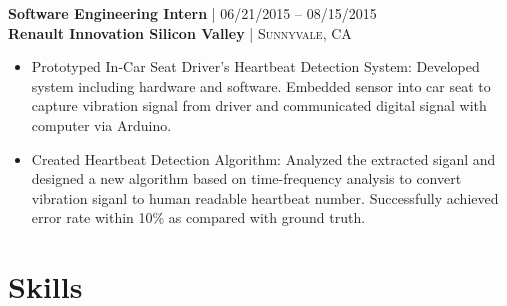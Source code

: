 \documentclass[10pt]{article} %
\begin{document}
{\begin{minipage}[t]{0.5\textwidth}
\begin{itemize}[leftmargin=*, topsep=2pt, partopsep=2.5pt]
\end{itemize}



{\raggedright\normalsize
\textbf{Software Engineering Intern} {\hfill\footnotesize\textsc{| 06/21/2015 -- 08/15/2015}}\\
\textbf{Renault Innovation Silicon Valley} {\hfill\footnotesize\textsc{| Sunnyvale, CA}}}

\begin{itemize}[leftmargin=*, topsep=2pt, partopsep=2.5pt]
\setlength\itemsep{1pt}

\item Prototyped In-Car Seat Driver's Heartbeat Detection System: Developed system including hardware and software. Embedded sensor into car seat to capture vibration signal from driver and communicated digital signal with computer via Arduino. 
\item Created Heartbeat Detection Algorithm: Analyzed the extracted siganl and designed a new algorithm based on time-frequency analysis to convert vibration siganl to human readable heartbeat number. Successfully achieved error rate within 10\% as compared with ground truth.
\end{itemize}



\end{minipage} %
\hfill
\begin{minipage}[t]{0.47\textwidth} %
\vspace{0pt} %



\section{Skills} 


\end{minipage}}
\end{document}
